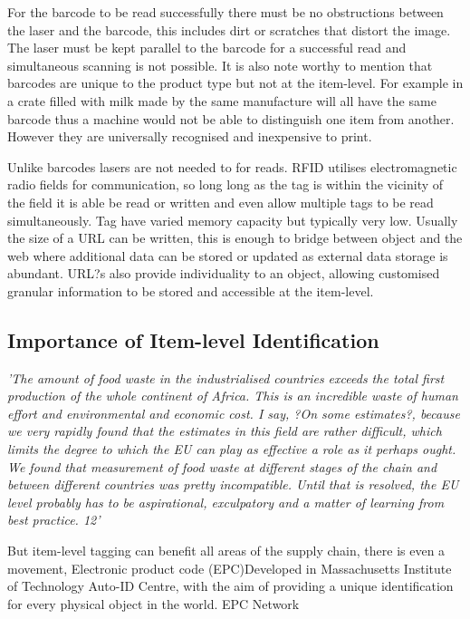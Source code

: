 \documentclass[a4paper, 11pt]{article}
\begin{document}
For the barcode to be read successfully there must be no obstructions between the laser and the barcode, this includes dirt or scratches that distort the image. The laser must be kept parallel to the barcode for a successful read and simultaneous scanning is not possible. It is also note worthy to mention that barcodes are unique to the product type but not at the item-level. For example in a crate filled with milk made by the same manufacture will all have the same barcode thus a machine would not be able to distinguish one item from another. However they are universally recognised and inexpensive to print. 

Unlike barcodes lasers are not needed to for reads. RFID utilises electromagnetic radio fields for communication, so long long as the tag is within the vicinity of the field it is able be read or written and even allow multiple tags to be read simultaneously. Tag have varied memory capacity but typically very low. Usually the size of a URL can be written, this is enough to bridge between object and the web where additional data can be stored or updated as external data storage is abundant. URL?s also provide individuality to an object, allowing customised granular information to be stored and accessible at the item-level.


\vspace{\baselineskip}
\vspace{\baselineskip}
\vspace{\baselineskip}

\subsection{Importance of Item-level Identification}
\emph{'The amount of food waste in the industrialised countries exceeds the total first
production of the whole continent of Africa. This is an incredible waste of human effort
and environmental and economic cost. I say, ?On some estimates?, because we very
rapidly found that the estimates in this field are rather difficult, which limits the degree
to which the EU can play as effective a role as it perhaps ought. We found that
measurement of food waste at different stages of the chain and between different
countries was pretty incompatible. Until that is resolved, the EU level probably has to
be aspirational, exculpatory and a matter of learning from best practice. 12'}

But item-level tagging can benefit all areas of the supply chain, there is even a movement, Electronic product code (EPC)Developed in Massachusetts Institute of Technology Auto-ID Centre, with the aim of providing a unique identification for every physical object in the world. EPC Network
\end{document}
